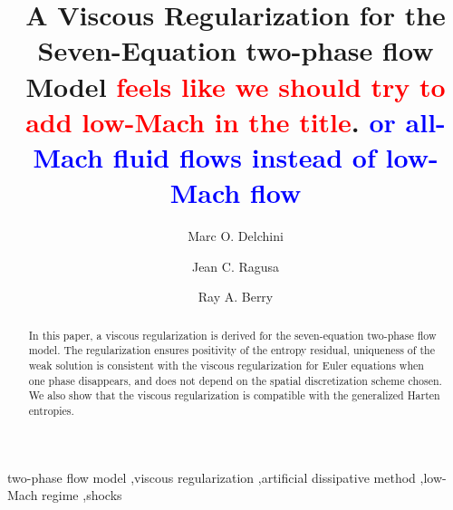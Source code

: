 \documentclass[preprint,10pt]{elsarticle}
\newcommand{\tcr}[1]{\textcolor{red}{#1}}
\newcommand{\tcb}[1]{\textcolor{blue}{#1}}
\begin{document}
\begin{frontmatter}


\title{A Viscous Regularization for the Seven-Equation two-phase flow Model \tcr{feels like we should try to add low-Mach in the title}. \tcb{or all-Mach fluid flows instead of low-Mach flow}}
\author{Marc O. Delchini}

\author{Jean C. Ragusa}

\author{Ray A. Berry}

\address[label1]{Department of Nuclear Engineering, Texas A\&M University, College Station, TX 77843, USA }

\address[label2]{Idaho National Laboratory, Idaho Falls, ID 83415, USA }

\begin{abstract}
In this paper, a viscous regularization is derived for the seven-equation two-phase flow model. The regularization ensures positivity of the entropy residual, uniqueness of the weak solution %
is consistent with the viscous regularization for Euler equations when one phase disappears, and does not depend on the spatial discretization scheme chosen. We also show that the viscous regularization is compatible with the generalized Harten entropies.
\end{abstract}
\begin{keyword}
  two-phase flow model \sep viscous regularization \sep artificial dissipative method \sep low-Mach regime \sep shocks 
\end{keyword}
\end{frontmatter}
\end{document}
